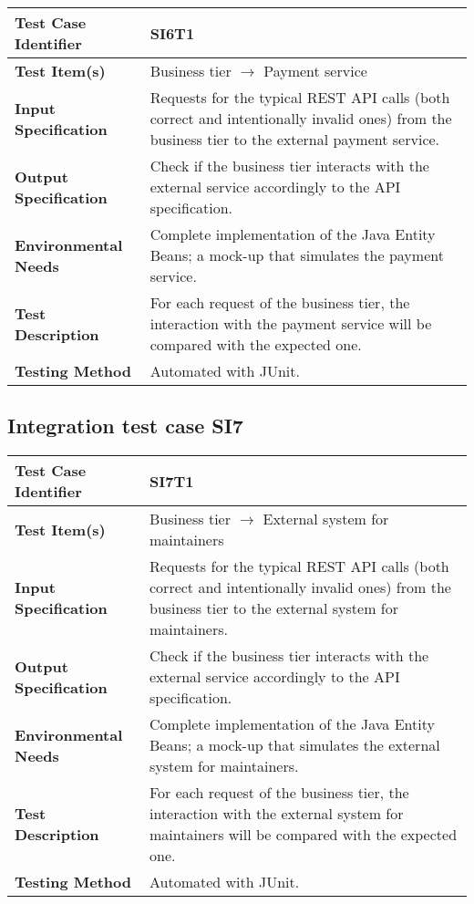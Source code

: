 \begin{tabular}{l p{}}
    \hline
    \textbf{Test Case Identifier} & SI6T1\\
    \hline
    \textbf{Test Item(s)} & Business tier $\rightarrow$ Payment service\\
    \hline
    \textbf{Input Specification} & Requests for the typical REST API calls (both correct and intentionally invalid ones) from the business tier to the external payment service.\\
    \hline
    \textbf{Output Specification} & Check if the business tier interacts with the external service accordingly to the API specification.\\
    \hline
    \textbf{Environmental Needs} & Complete implementation of the Java Entity Beans; a mock-up that simulates the payment service.\\
    \hline
    \textbf{Test Description} & For each request of the business tier, the interaction with the payment service will be compared with the expected one.\\
    \hline
    \textbf{Testing Method} & Automated with JUnit.\\
    \hline
\end{tabular}

\vspace{2em}

\subsection{Integration test case SI7}
\label{sec:performance-business}

\begin{tabular}{l p{}}
    \hline
    \textbf{Test Case Identifier} & SI7T1\\
    \hline
    \textbf{Test Item(s)} & Business tier $\rightarrow$ External system for maintainers\\
    \hline
    \textbf{Input Specification} & Requests for the typical REST API calls (both correct and intentionally invalid ones) from the business tier to the external system for maintainers.\\
    \hline
    \textbf{Output Specification} & Check if the business tier interacts with the external service accordingly to the API specification.\\
    \hline
    \textbf{Environmental Needs} & Complete implementation of the Java Entity Beans; a mock-up that simulates the external system for maintainers.\\
    \hline
    \textbf{Test Description} & For each request of the business tier, the interaction with the external system for maintainers will be compared with the expected one.\\
    \hline
    \textbf{Testing Method} & Automated with JUnit.\\
    \hline
\end{tabular}

